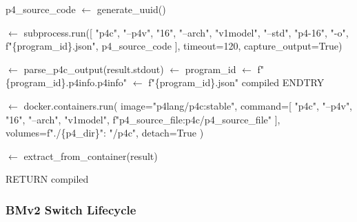 \documentclass[10pt,a4paper]{article}
\begin{document}
\begin{algorithm}
\caption{P4 Program Compilation}
\begin{algorithmic}[H]
\REQUIRE p4\_source\_code
 $\leftarrow$ generate\_uuid()

\TRY
     $\leftarrow$ subprocess.run([
        "p4c", "--p4v", "16",
        "--arch", "v1model",
        "--std", "p4-16",
        "-o", f"\{program\_id\}.json",
        p4\_source\_code
    ], timeout=120, capture_output=True)

     \THEN
         $\leftarrow$ parse\_p4c\_output(result.stdout)
         $\leftarrow$ program\_id
         $\leftarrow$ f"\{program\_id\}.p4info.p4info"
         $\leftarrow$ f"\{program\_id\}.json"
        \RETURN compiled
    \ENDIF
{}
ENDTRY

 $\leftarrow$ docker.containers.run(
    image="p4lang/p4c:stable",
    command=[
        "p4c", "--p4v", "16",
        "--arch", "v1model",
        f"{p4\_source\_file}:p4c/{p4\_source\_file}"
    ],
    volumes={f"./\{p4\_dir\}": "/p4c"},
    detach=True
)

 $\leftarrow$ extract\_from\_container(result)

RETURN compiled
\end{algorithmic}
\end{algorithm}

\subsubsection{BMv2 Switch Lifecycle}
\end{document}
